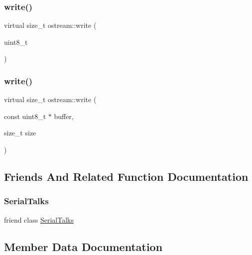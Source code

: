 \subsubsection{\texorpdfstring{write()}{write()}\hspace{0.1cm}{\footnotesize\ttfamily [1/2]}}
{\footnotesize\ttfamily virtual size\+\_\+t ostream\+::write (\begin{DoxyParamCaption}\item[{uint8\+\_\+t}]{ }\end{DoxyParamCaption})\hspace{0.3cm}{\ttfamily [virtual]}}

\mbox{\label{classostream_a3beab2da985550ca8ba66b4a77a410fb}} 
\subsubsection{\texorpdfstring{write()}{write()}\hspace{0.1cm}{\footnotesize\ttfamily [2/2]}}
{\footnotesize\ttfamily virtual size\+\_\+t ostream\+::write (\begin{DoxyParamCaption}\item[{const uint8\+\_\+t $\ast$}]{buffer,  }\item[{size\+\_\+t}]{size }\end{DoxyParamCaption})\hspace{0.3cm}{\ttfamily [virtual]}}



\subsection{Friends And Related Function Documentation}
\mbox{\label{classostream_a4cd752c675c62b44d1424308b66cf98c}} 
\subsubsection{\texorpdfstring{Serial\+Talks}{SerialTalks}}
{\footnotesize\ttfamily friend class \hyperlink{class_serial_talks}{Serial\+Talks}\hspace{0.3cm}{\ttfamily [friend]}}



\subsection{Member Data Documentation}
\mbox{\label{classostream_ae7a12b9eca5c965ccaf44e09a63c4395}} 
